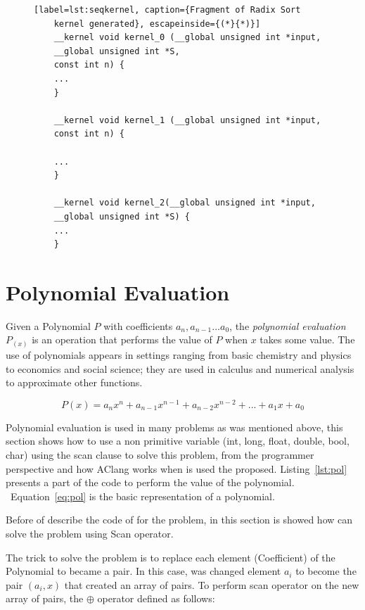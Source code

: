 \documentclass[Ingles]{ic-tese-v1}
\newcommand{\req}[1]{Equation~\ref{eq:#1}}
\newcommand{\rlst}[1]{Listing~\ref{lst:#1}}
\begin{document}
\begin{figure}[t]
	\lstset{basicstyle=\scriptsize}
	\begin{lstlisting}[label=lst:seqkernel, caption={Fragment of Radix Sort
	kernel generated}, escapeinside={(*}{*)}]
	__kernel void kernel_0 (__global unsigned int *input,
	__global unsigned int *S,
	const int n) {
	...
	}

	__kernel void kernel_1 (__global unsigned int *input,
	const int n) {

	...
	}

	__kernel void kernel_2(__global unsigned int *input,
	__global unsigned int *S) {
	...
	}
	\end{lstlisting}
\end{figure}

\section{Polynomial Evaluation}
\label{sec:PolEval}

Given a Polynomial $P$ with coefficients $a_{n}, a_{n-1} ... a_{0}$, the \textit{polynomial evaluation} $P_{(x)}$ is an operation
that performs the value of $P$ when $x$ takes some value. The use of polynomials
appears in settings ranging from basic chemistry and physics to economics and social science; they are used in calculus and numerical analysis to approximate other functions.


\begin{equation}
P(x) = a_{n}x^n + a_{n-1}x^{n-1} + a_{n-2}x^{n-2} + ... + a_{1}x + a_{0}
\label{eq:pol}
\end{equation}

Polynomial evaluation is used in many problems as was mentioned above, this
section shows how to use a non primitive variable (int, long, float, double, bool, char)
using the scan clause to solve this problem, from the programmer perspective
and how AClang works when is used the proposed. \rlst{pol} presents
a part of the code to perform the value of the polynomial. ~\req{pol} is the basic
representation of a polynomial.

Before of describe the code of for the problem, in this section is
showed how can solve the problem using Scan operator.

The trick to solve the problem is to replace each element (Coefficient) of the Polynomial to became a pair. In this case, was changed element $a_{i}$ to become the pair $(a_{i}, x)$ that
created an array of pairs. To perform scan operator on the new array of pairs, the $\oplus$ operator defined as follows:
\end{document}

